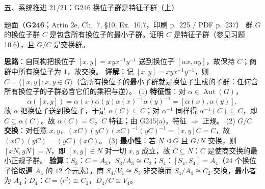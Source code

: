 \documentclass[aspectratio=169,10pt,fontset=none]{ctexbeamer}
\newcommand{\ex}[1]{\textcolor{accent}{\footnotesize\bfseries #1}}
\newcommand{\key}[1]{\textcolor{ink}{\bfseries #1}}
\begin{document}
\begin{frame}[t]{五、系统推进 21/21：G246 换位子群是特征子群（上）}
\label{ex:G246}
\scriptsize
\begin{block}{\footnotesize 题面（\ex{G246}；Artin 2e, Ch.~7, \S10, Ex.~10.7，印刷 p.~225 / PDF p.~237）}
群 $G$ 的换位子群 $C$ 是包含所有换位子的最小子群。证明 $C$ 是特征子群（参见习题 10.6），且 $G/C$ 是交换群。
\end{block}
\key{思路}：自同构把换位子 $[x,y]=xyx^{-1}y^{-1}$ 送到换位子 $[\alpha x,\alpha y]$，故保持 $C$；商群中所有换位子为 $1$，故交换。
\key{详解}：记 $[x,y]=xyx^{-1}y^{-1}$，则 $C=\langle[x,y]:x,y\in G\rangle$（含所有换位子的最小子群就是换位子生成的子群：任何含所有换位子的子群必含它们的乘积与逆）。
(1) \textbf{特征性}：对 $\alpha\in\operatorname{Aut}(G)$，
\[ \alpha([x,y])=\alpha(x)\alpha(y)\alpha(x)^{-1}\alpha(y)^{-1}=[\alpha(x),\alpha(y)], \]
故 $\alpha$ 把换位子送到换位子，于是 $\alpha(C)\subseteq C$；对 $\alpha^{-1}$ 同样得 $\alpha^{-1}(C)\subseteq C$，即 $C\subseteq\alpha(C)$。故 $\alpha(C)=C$，$C$ 特征；由 G245(a)，特征 $\Rightarrow$ 正规。
(2) \textbf{$G/C$ 交换}：对任意 $x,y$，$(xC)(yC)(xC)^{-1}(yC)^{-1}=[x,y]C=C$，故 $(xC)(yC)=(yC)(xC)$。
(3) \textbf{最小性}：若 $N\trianglelefteq G$ 且 $G/N$ 交换，则 $[xN,yN]=N$，即 $[x,y]\in N$ 对一切 $x,y$ 成立，故 $C\subseteq N$：$C$ 是使商交换的最小正规子群。
\key{验算}：$S_3$：$C=A_3$，$S_3/A_3\cong C_2$；$S_4$：$[S_4,S_4]=A_4$（$24$ 个换位子恰取遍 $A_4$ 的 $12$ 个元素），商 $S_4/V_4\cong S_3$ 非交换而 $S_4/A_4\cong C_2$ 交换，最小者为 $A_4$；$D_4$：$C=\langle r^2\rangle\cong C_2$，$D_4/C\cong V_4$。
\end{frame}
\end{document}

